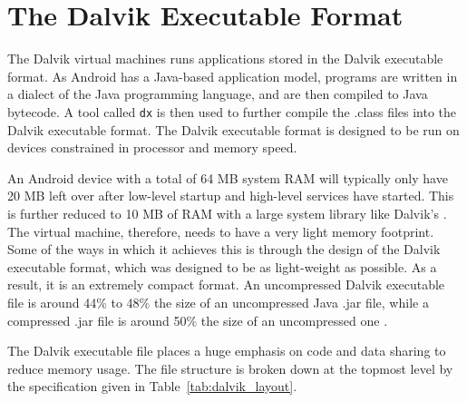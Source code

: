 \section{The Dalvik Executable Format}
\label{sec:dex}

The Dalvik virtual machines runs applications stored in the Dalvik executable format. As Android has a Java-based application model, programs are written in a dialect of the Java programming language, and are then compiled to Java bytecode. A tool called \verb|dx| is then used to further compile the .class files into the Dalvik executable format. The Dalvik executable format is designed to be run on devices constrained in processor and memory speed.

An Android device with a total of 64 MB system RAM will typically only have 20 MB left over after low-level startup and high-level services have started. This is further reduced to 10 MB of RAM with a large system library like Dalvik's \cite{dalvik_int}. The virtual machine, therefore, needs to have a very light memory footprint. Some of the ways in which it achieves this is through the design of the Dalvik executable format, which was designed to be as light-weight as possible. As a result, it is an extremely compact format. An uncompressed Dalvik executable file is around 44\% to 48\% the size of an uncompressed Java .jar file, while a compressed .jar file is around 50\% the size of an uncompressed one \cite{dalvik_int}.

The Dalvik executable file places a huge emphasis on code and data sharing to reduce memory usage. The file structure is broken down at the topmost level by the specification given in Table~\ref{tab:dalvik_layout}.

